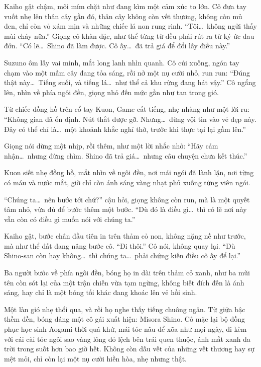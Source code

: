\documentclass[../main.tex]{subfiles}
\begin{document}
Kaiho gật chậm, môi mím chặt như đang kìm một cảm xúc to lớn. Cô đưa tay vuốt nhẹ lên thân cây gần đó, thân cây không còn vết thương, không còn mủ đen, chỉ còn vỏ xám mịn và những chiếc lá non rung rinh. ``Tôi\dots\ không ngửi thấy mùi cháy nữa.'' Giọng cô khàn đặc, như thể từng từ đều phải rút ra từ ký ức đau đớn. ``Có lẽ\dots\ Shino đã làm được. Cô ấy\dots\ đã trả giá để đổi lấy điều này.''

Suzuno ôm lấy vai mình, mắt long lanh nhìn quanh. Cô cúi xuống, ngón tay chạm vào một mầm cây đang tỏa sáng, rồi nở một nụ cười nhỏ, run run: ``Đúng thật này\dots\ Tiếng suối, và tiếng lá\dots\ như thể cả khu rừng đang hát vậy.'' Cô ngẩng lên, nhìn về phía ngôi đền, giọng nhỏ đến mức gần như tan trong gió.

Từ chiếc đồng hồ trên cổ tay Kuon, Game cất tiếng, nhẹ nhàng như một lời ru: ``Không gian đã ổn định. Nút thắt được gỡ. Nhưng\dots\ đừng vội tin vào vẻ đẹp này. Đây có thể chỉ là\dots\ một khoảnh khắc nghỉ thở, trước khi thực tại lại gầm lên.''

Giọng nói dừng một nhịp, rồi thêm, như một lời nhắc nhở: ``Hãy cảm nhận\dots\ nhưng đừng chìm. Shino đã trả giá\dots\ nhưng câu chuyện chưa kết thúc.''

Kuon siết nhẹ đồng hồ, mắt nhìn về ngôi đền, nơi mái ngói đã lành lặn, nơi từng có máu và nước mắt, giờ chỉ còn ánh sáng vàng nhạt phủ xuống từng viên ngói.

``Chúng ta\dots\ nên bước tới chứ?'' cậu hỏi, giọng không còn run, mà là một quyết tâm nhỏ, vừa đủ để bước thêm một bước. ``Dù đó là điều gì\dots\ thì có lẽ nơi này vẫn còn có điều gì muốn nói với chúng ta.''

Kaiho gật, bước chân đầu tiên in trên thảm cỏ non, không nặng nề như trước, mà như thể đất đang nâng bước cô. ``Đi thôi.'' Cô nói, không quay lại. ``Dù Shino-san còn hay không\dots\ thì chúng ta\dots\ phải chứng kiến điều cô ấy để lại.''

Ba người bước về phía ngôi đền, bóng họ in dài trên thảm cỏ xanh, như ba mũi tên còn sót lại của một trận chiến vừa tạm ngừng, không biết đích đến là ánh sáng, hay chỉ là một bóng tối khác đang khoác lên vẻ hồi sinh.

Một làn gió nhẹ thổi qua, và rồi họ nghe thấy tiếng chuông ngân. Từ giữa bậc thềm đền, bóng dáng một cô gái xuất hiện: Misora Shino. Cô mặc lại bộ đồng phục học sinh Aogami thời quá khứ, mái tóc nâu để xõa như mọi ngày, đi kèm với cái cài tóc ngôi sao vàng lông đỏ lệch bên trái quen thuộc, ánh mắt xanh da trời trong suốt hơn bao giờ hết. Không còn dấu vết của những vết thương hay sự mệt mỏi, chỉ còn lại một nụ cười hiền hòa, nhẹ nhưng thật.
\end{document}
